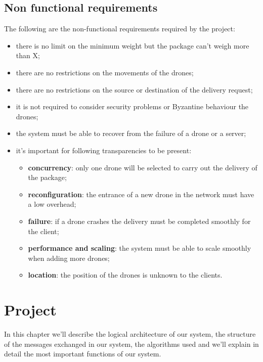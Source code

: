\documentclass[a4paper, oneside]{memoir}
\begin{document}
\section{Non functional requirements}


The following are the non-functional requirements required by the project:
\begin{itemize}
\item there is no limit on the minimum weight but the package can't weigh more than X;
\item there are no restrictions on the movements of the drones;
\item there are no restrictions on the source or destination of the delivery request;
\item it is not required to consider security problems or Byzantine behaviour the drones;

\item the system must be able to recover from the failure of a drone or a server;
\item it's important for following transparencies to be present:
	\begin{itemize}
	\item \textbf{concurrency}: only one drone will be selected to carry out the delivery of the package;
	\item \textbf{reconfiguration}: the entrance of a new drone in the network must have a low overhead;
	\item \textbf{failure}: if a drone crashes the delivery must be completed smoothly for the client;
	\item \textbf{performance and scaling}: the system must be able to scale smoothly when adding more drones;
	\item \textbf{location}: the position of the drones is unknown to the clients.
	\end{itemize}
\end{itemize}


\chapter{Project}
In this chapter we'll describe the logical architecture of our system, the structure of the messages exchanged in our system, the algorithms used and we'll explain in detail the most important functions of our system.
\end{document}
